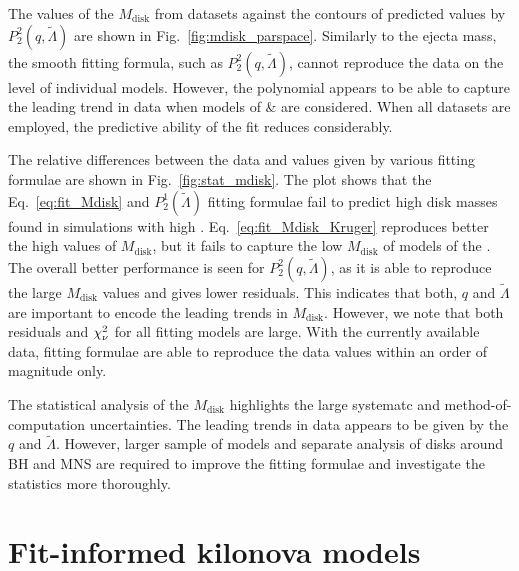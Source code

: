 The values of the $M_{\text{disk}}$ from datasets against the contours of predicted 
values by $P_2^2(q,\tilde{\Lambda})$ are shown in Fig.~\ref{fig:mdisk_parspace}.
Similarly to the ejecta mass, the smooth fitting formula, such as $P_2^2(q,\tilde{\Lambda})$, 
cannot reproduce the data on the level of individual models. However, the 
polynomial appears to be able to capture the leading trend in data when 
models of \DSrefset{} \& \DSheatcool{} are considered.
When all datasets are employed, the predictive ability of the fit reduces considerably.

The relative differences between the data and values given by various fitting formulae are 
shown in Fig.~\ref{fig:stat_mdisk}.
%
The plot shows that the Eq.~\eqref{eq:fit_Mdisk} and $P_2^1(\tilde{\Lambda})$ fitting 
formulae fail to predict high disk masses found in simulations with high \mr{}. 
Eq.~\eqref{eq:fit_Mdisk_Kruger} reproduces better the high values of $M_{\text{disk}}$, 
but it fails to capture the low $M_{\text{disk}}$ of models of the \DSnone{}.
%
The overall better performance is seen for $P_2^2(q,\tilde{\Lambda})$, as it is able 
to reproduce the large $M_{\text{disk}}$ values and gives lower residuals.
This indicates that both, $q$ and $\tilde{\Lambda}$ are important to encode the leading trends in $M_{\text{disk}}$.
However, we note that both residuals and $\chi_{\nu}^2$ for all fitting models are large.
With the currently available data, fitting formulae are able to reproduce 
the data values within an order of magnitude only.

The statistical analysis of the $M_{\text{disk}}$ highlights the large systematc 
and method-of-computation uncertainties. The leading trends in data appears to be given 
by the $q$ and $\tilde{\Lambda}$. However, larger sample of models and 
separate analysis of disks around \ac{BH} and \ac{MNS} are required to improve the 
fitting formulae and investigate the statistics more thoroughly. 



\section{Fit-informed kilonova models}



